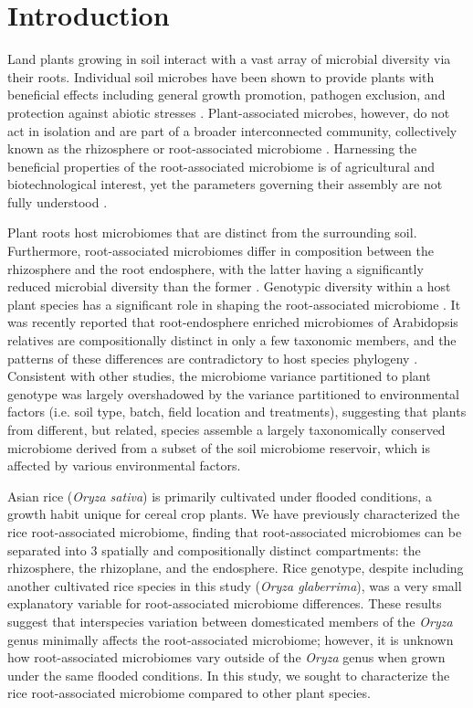 \section{Introduction}
Land plants growing in soil interact with a vast array of microbial diversity via their roots. Individual soil microbes have been shown to provide plants with beneficial effects including general growth promotion, pathogen exclusion, and protection against abiotic stresses \cite{Berendsen2012}. Plant-associated microbes, however, do not act in isolation and are part of a broader interconnected community, collectively known as the rhizosphere or root-associated microbiome \cite{Bulgarelli2013}. Harnessing the beneficial properties of the root-associated microbiome is of agricultural and biotechnological interest, yet the parameters governing their assembly are not fully understood \cite{Bulgarelli2013}. 

Plant roots host microbiomes that are distinct from the surrounding soil. Furthermore, root-associated microbiomes differ in composition between the rhizosphere and the root endosphere, with the latter having a significantly reduced microbial diversity than the former \cite{Lundberg2012,Bulgarelli2012,Edwards2015,Peiffer2013,Wagner2016,Zarraonaindia2015}. Genotypic diversity within a host plant species has a significant role in shaping the root-associated microbiome \cite{Lundberg2012,Wagner2016,Peiffer2013,Edwards2015}. It was recently reported that root-endosphere enriched microbiomes of Arabidopsis relatives are compositionally distinct in only a few taxonomic members, and the patterns of these differences are contradictory to host species phylogeny \cite{Schlaeppi2014}. Consistent with other studies, the microbiome variance partitioned to plant genotype was largely overshadowed by the variance partitioned to environmental factors (i.e. soil type, batch, field location and treatments), suggesting that plants from different, but related, species assemble a largely taxonomically conserved microbiome derived from a subset of the soil microbiome reservoir, which is affected by various environmental factors.

Asian rice (\textit{Oryza sativa}) is primarily cultivated under flooded conditions, a growth habit unique for cereal crop plants. We have previously characterized the rice root-associated microbiome, finding that root-associated microbiomes can be separated into 3 spatially and compositionally distinct compartments: the rhizosphere, the rhizoplane, and the endosphere. Rice genotype, despite including another cultivated rice species in this study (\textit{Oryza glaberrima}), was a very small explanatory variable for root-associated microbiome differences. These results suggest that interspecies variation between domesticated members of the \textit{Oryza} genus minimally affects the root-associated microbiome; however, it is unknown how root-associated microbiomes vary outside of the \textit{Oryza} genus when grown under the same flooded conditions. In this study, we sought to characterize the rice root-associated microbiome compared to other plant species.

